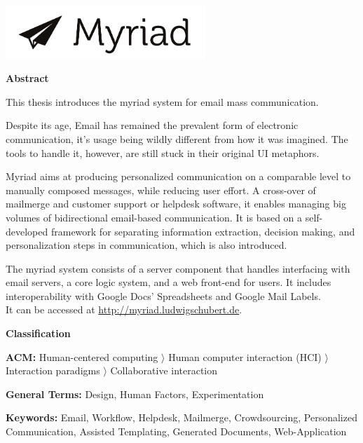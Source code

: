 

\clearemptydoublepage
{}
{}

\begin{center}
  \includegraphics[height=2cm]{figures/myriad-logo.pdf}
\end{center}


\begin{center}
{\Large \bf Abstract}
\end{center}

This thesis introduces the myriad system for email mass communication.

Despite its age, Email has remained the prevalent form of electronic communication, it's usage being wildly different from how it was imagined. The tools to handle it, however, are still stuck in their original UI metaphors.

Myriad aims at producing personalized communication on a comparable level to manually composed messages, while reducing user effort.
A cross-over of mailmerge and customer support or helpdesk software, it enables managing big volumes of bidirectional email-based communication.
It is based on a self-developed framework for separating information extraction, decision making, and personalization steps in communication, which is also introduced.

The myriad system consists of a server component that handles interfacing with email servers, a core logic system, and a web front-end for users. It includes interoperability with Google Docs' Spreadsheets and Google Mail Labels. \\ It can be accessed at \url{http://myriad.ludwigschubert.de}.

\begin{center}
{\Large \bf Classification}
\end{center}

\textbf{ACM:} Human-centered computing $\rangle$ Human computer interaction (HCI) $\rangle$ Interaction paradigms $\rangle$ Collaborative interaction

\textbf{General Terms:} Design, Human Factors, Experimentation

\textbf{Keywords:} Email, Workflow, Helpdesk, Mailmerge, Crowdsourcing, Personalized Communication, Assisted Templating, Generated Documents, Web-Application
